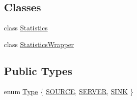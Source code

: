 \subsection*{Classes}
\begin{DoxyCompactItemize}
\item 
class \hyperlink{class_generic_node_1_1_statistics}{Statistics}
\item 
class \hyperlink{class_generic_node_1_1_statistics_wrapper}{Statistics\+Wrapper}
\end{DoxyCompactItemize}
\subsection*{Public Types}
\begin{DoxyCompactItemize}
\item 
enum \hyperlink{class_generic_node_a9e7985ab9bbfa1c85091adc0ab71a6b6}{Type} \{ \hyperlink{class_generic_node_a9e7985ab9bbfa1c85091adc0ab71a6b6a4bbea859e46a6b70d8ede4c1c496b208}{S\+O\+U\+R\+CE}, 
\hyperlink{class_generic_node_a9e7985ab9bbfa1c85091adc0ab71a6b6a163157213f82876880a7c38556d690b0}{S\+E\+R\+V\+ER}, 
\hyperlink{class_generic_node_a9e7985ab9bbfa1c85091adc0ab71a6b6a21098ba9c0d34b59299b2424c9d29998}{S\+I\+NK}
 \}
\end{DoxyCompactItemize}
